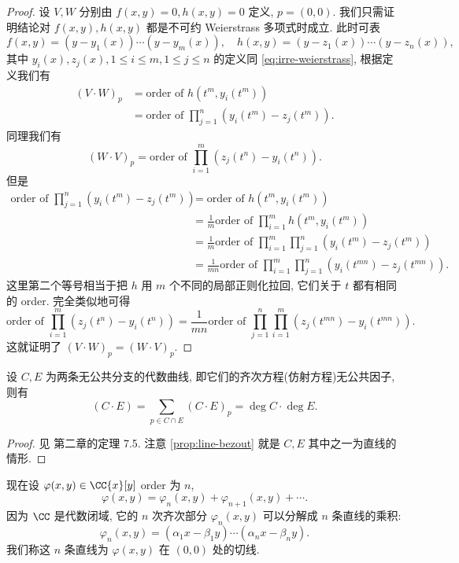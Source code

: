 \begin{proof}
设 $V,W$ 分别由 $f(x,y) = 0, h(x,y) = 0$ 定义, $p = (0,0)$.
我们只需证明结论对 $f(x,y), h(x,y)$ 都是不可约 Weierstrass 多项式时成立.
此时可表
\[f(x,y) = (y-y_1(x))\cdots (y-y_m(x)), \quad h(x,y) = (y-z_1(x))\cdots (y-z_n(x)),\]
其中 $y_i(x), z_j(x), 1 \le i \le m, 1 \le j \le n$
的定义同 \cref{eq:irre-weierstrass},
根据定义我们有
\begin{align*}
    (V\cdot W)_p &= \text{order of }h(t^m, y_i(t^m))\\
    &=\text{order of }\prod_{j=1}^n(y_i(t^m) - z_j(t^m)).
\end{align*}
同理我们有
\[(W\cdot V)_p = \text{order of }\prod_{i=1}^m(z_j(t^n) - y_i(t^n)). \]
但是
\begin{align*}
    \text{order of }\prod_{j=1}^n(y_i(t^m) - z_j(t^m)) &= \text{order of }h(t^m, y_i(t^m))\\
    &=\frac{1}{m}\text{order of }\prod_{i=1}^m h(t^m, y_i(t^m))\\
    &=\frac{1}{m}\text{order of }\prod_{i=1}^m\prod_{j=1}^n (y_i(t^m) - z_j(t^m))\\
    &=\frac{1}{mn}\text{order of }\prod_{i=1}^m\prod_{j=1}^n (y_i(t^{mn}) - z_j(t^{mn})).
\end{align*}
这里第二个等号相当于把 $h$ 用 $m$ 个不同的局部正则化拉回,
它们关于 $t$ 都有相同的 order.
完全类似地可得
\[\text{order of }\prod_{i=1}^m(z_j(t^n) - y_i(t^n))=\frac{1}{mn}\text{order of }\prod_{j=1}^n\prod_{i=1}^m (z_j(t^{mn}) - y_i(t^{mn})).\]
这就证明了 $(V\cdot W)_p = (W\cdot V)_p$.
\end{proof}

\begin{thm}[Bezout]
\label{thm:Bezout}
设 $C, E$ 为两条无公共分支的代数曲线, 即它们的齐次方程(仿射方程)无公共因子,
则有
\[(C\cdot E) = \sum_{p \in C\cap E}(C\cdot E)_p = \deg C \cdot \deg E.\]
\end{thm}

\begin{proof}
见 \cite{textbook} 第二章的定理 7.5.
注意 \cref{prop:line-bezout} 就是 $C,E$ 其中之一为直线的情形.
\end{proof}

现在设 $\varphi(x,y) \in \CC\{x\}[y]$ order 为 $n$,
\[\varphi(x,y) = \varphi_n(x,y) + \varphi_{n+1}(x,y) + \cdots.\]
因为 $\CC$ 是代数闭域, 它的 $n$ 次齐次部分 $\varphi_n(x,y)$ 可以分解成 $n$ 条直线的乘积:
\[\varphi_n(x,y) = (\alpha_1x - \beta_1y)\cdots (\alpha_nx - \beta_ny).\]
我们称这 $n$ 条直线为 $\varphi(x,y)$ 在 $(0,0)$ 处的切线.

